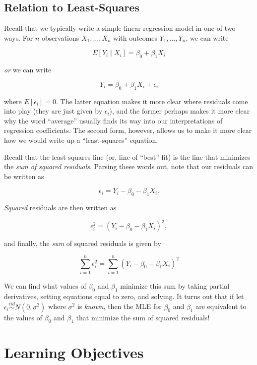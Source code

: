 \documentclass[
  letterpaper,
  DIV=11,
  numbers=noendperiod]{scrreprt}
\begin{document}
\hypertarget{relation-to-least-squares}{%
\subsection*{Relation to
Least-Squares}\label{relation-to-least-squares}}

Recall that we typically write a simple linear regression model in one
of two ways. For \(n\) observations \(X_1, \dots, X_n\) with outcomes
\(Y_1, \dots, Y_n\), we can write

\[
E[Y_i \mid X_i] = \beta_0 + \beta_1 X_i
\]

\emph{or} we can write

\[
Y_i = \beta_0 + \beta_1 X_i + \epsilon_i
\]

where \(E[\epsilon_i] = 0\). The latter equation makes it more clear
where residuals come into play (they are just given by \(\epsilon_i\)),
and the former perhaps makes it more clear why the word ``average''
usually finds its way into our interpretations of regression
coefficients. The second form, however, allows us to make it more clear
how we would write up a ``least-squares'' equation.

Recall that the least-squares line (or, line of ``best'' fit) is the
line that minimizes the \emph{sum of squared residuals}. Parsing these
words out, note that our residuals can be written as

\[
\epsilon_i = Y_i - \beta_0 - \beta_1 X_i.
\]

\emph{Squared} residuals are then written as

\[
\epsilon_i^2 = (Y_i - \beta_0 - \beta_1 X_i)^2,
\]

and finally, the \emph{sum} of squared residuals is given by

\[
\sum_{i = 1}^n \epsilon_i^2 = \sum_{i = 1}^n (Y_i - \beta_0 - \beta_1 X_i)^2
\]

We can find what values of \(\beta_0\) and \(\beta_1\) minimize this sum
by taking partial derivatives, setting equations equal to zero, and
solving. It turns out that if let
\(\epsilon_i \overset{iid}{\sim} N(0, \sigma^2)\) where \(\sigma^2\) is
\emph{known}, then the MLE for \(\beta_0\) and \(\beta_1\) are
equivalent to the values of \(\beta_0\) and \(\beta_1\) that minimize
the sum of squared residuals!

\hypertarget{learning-objectives-1}{%
\section{Learning Objectives}\label{learning-objectives-1}}
\end{document}
